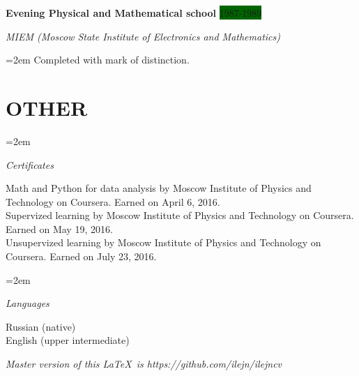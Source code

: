 \documentclass[paper=a4,fontsize=11pt]{scrartcl} %
\newlength{\spacebox}
\newcommand{\NewPart}[1]{\section*{\uppercase{#1}}}
\newcommand{\SkillsEntry}[2]{\pagebreak[2]    
        \noindent\hangindent=2em\hangafter=0 %
        \parbox{\spacebox}{        %
        \textit{#1}}               %
        \hspace{1.5em} \vspace{1em}  \parbox{0.77\textwidth}{#2} \par}    %
\newcommand{\EducationEntry}[4]{\pagebreak[2]
        \noindent \textbf{#1} \hfill      %
        \colorbox{DarkGreen}{%
            \hfill\color{White}#2} \par  %
        \noindent \textit{#3} \par        %
        \noindent\hangindent=2em\hangafter=0 \small #4 %
        \normalsize \par}
\newcommand{\BottomLine}[1]{
        \vfill\center\textit{#1}\par
        }
\begin{document}
\EducationEntry{Evening Physical and Mathematical school}{1987-1989}{MIEM (Moscow State Institute of Electronics and Mathematics)}{Completed with mark of distinction.}

\NewPart{Other}{}


\SkillsEntry{Certificates}{Math and Python for data analysis by Moscow Institute of Physics and Technology on Coursera. Earned on April 6, 2016. \\
  Supervized learning by Moscow Institute of Physics and Technology on Coursera. Earned on May 19, 2016. \\
  Unsupervized learning by Moscow Institute of Physics and Technology on Coursera. Earned on July 23, 2016.}

\SkillsEntry{Languages}{Russian (native)  \\
   English (upper intermediate)}


\BottomLine{Master version of this \LaTeX \ is https://github.com/ilejn/ilejncv }
\end{document}
